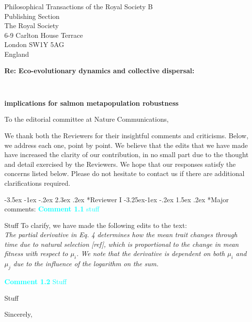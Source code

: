 \documentclass[ucm,12pt]{ucletter}
\makeatletter
\newcounter{section}
\newcounter{subsection}[section]
\renewcommand\section{\@startsection {section}{1}{\z@}%
                                   {-3.5ex \@plus -1ex \@minus -.2ex}%
                                   {2.3ex \@plus.2ex}%
                                   {\normalfont\Large\bfseries}}
\newcommand\subsection{\@startsection{subsection}{2}{\z@}%
                                     {-3.25ex\@plus -1ex \@minus -.2ex}%
                                     {1.5ex \@plus .2ex}%
                                     {\normalfont\large\bfseries}}
\makeatother
\begin{document}
\begin{letter}{
    Philosophical Transactions of the Royal Society B\\
    Publishing Section\\
    The Royal Society\\
    6-9 Carlton House Terrace\\
    London SW1Y 5AG\\
    England\\
    \centerline{\bf{Re: Eco-evolutionary dynamics and collective dispersal:}}\\
     \centerline{\bf{implications for salmon metapopulation robustness}}
}


\opening{To the editorial committee at Nature Communications,}

We thank both the Reviewers for their insightful comments and criticisms. Below, we address each one, point by point. We believe that the edits that we have made have increased the clarity of our contribution, in no small part due to the thought and detail exercised by the Reviewers. We hope that our responses satisfy the concerns listed below. Please do not hesitate to contact us if there are additional clarifications required.


\section*{Reviewer I}
\subsection*{Major comments:}
\noindent \textcolor{cyan}{
{\bf Comment 1.1} stuff
}

 Stuff
\noindent To clarify, we have made the following edits to the text:\\
 \emph{The partial derivative in Eq. 4 determines how the mean trait changes through time due to natural selection [ref], which is proportional to the change in mean fitness with respect to $\mu_i$.
We note that the derivative is dependent on both $\mu_i$ and $\mu_j$ due to the influence of the logarithm on the sum.}

\noindent \textcolor{cyan}{
{\bf Comment 1.2} Stuff
}

 Stuff

\vspace{5mm}

\singlespacing
\closing{Sincerely,\\
\\
}


\end{letter}
\end{document}
